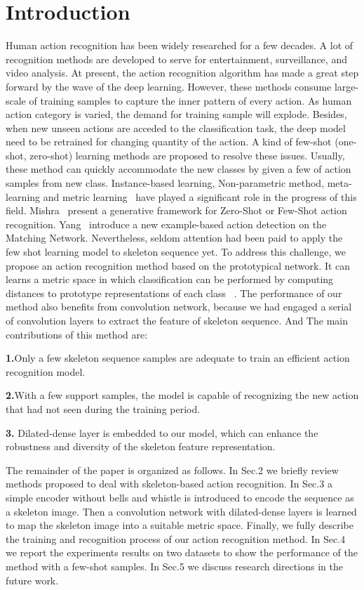 \documentclass{bmvc2k}
\begin{document}
\section{Introduction}
\label{sec:intro}
Human action recognition has been widely researched for a few decades. A lot of recognition methods are developed to serve for entertainment, surveillance, and video analysis. At present, the action recognition algorithm has made a great step forward by the wave of the deep learning. However, these methods consume large-scale of training samples to capture the inner pattern of every action. As human action category is varied, the demand for training sample will explode. Besides, when new unseen actions are acceded to the classification task, the deep model need to be retrained for changing quantity of the action. A kind of few-shot (one-shot, zero-shot) learning methods are proposed to resolve these issues. Usually, these method can quickly accommodate the new classes by given a few of action samples from new class. Instance-based learning, Non-parametric method, meta-learning and metric learning~\cite{davis2007information} have played a significant role in the progress of this field. Mishra~\cite{mishra2018generative} present a generative framework for Zero-Shot or Few-Shot action recognition. Yang~\cite{yang2018one} introduce a new example-based action detection on the Matching Network. Nevertheless, seldom attention had been paid to apply the few shot learning model to skeleton sequence yet. To address this challenge, we propose an action recognition method based on the prototypical network. It can learns a metric space in which classification can be performed by computing distances to prototype representations of each class ~\cite{snell2017prototypical}. The performance of our method also benefits from convolution network, because we had engaged a serial of convolution layers to extract the feature of skeleton sequence. And The main contributions of this method are:

\textbf{1.}Only a few skeleton sequence samples are adequate to train an efficient action recognition model.

\textbf{2.}With a few support samples, the model is capable of recognizing the new action that had not seen during the training period.

\textbf{3.}	Dilated-dense layer is embedded to our model, which can enhance the robustness and diversity of the skeleton feature representation. 

The remainder of the paper is organized as follows. In Sec.2 we briefly review methods proposed to deal with skeleton-based action recognition. In Sec.3 a simple encoder without bells and whistle is introduced to encode the sequence as a skeleton image. Then a convolution network with dilated-dense layers is learned to map the skeleton image into a suitable metric space. Finally, we fully describe the training and recognition process of our action recognition method. In Sec.4 we report the experiments results on two datasets to show the performance of the method with a few-shot samples. In Sec.5 we discuss research directions in the future work.
\end{document}

